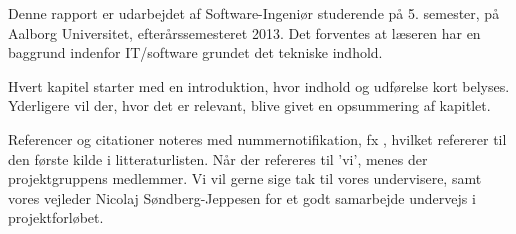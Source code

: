 Denne rapport er udarbejdet af Software-Ingeniør studerende på 5. semester, på Aalborg Universitet, efterårssemesteret 2013.
Det forventes at læseren har en baggrund indenfor IT/software grundet det tekniske indhold.

Hvert kapitel starter med en introduktion, hvor indhold og udførelse kort belyses.
Yderligere vil der, hvor det er relevant, blive givet en opsummering af kapitlet.

Referencer og citationer noteres med nummernotifikation, fx \cite{probabilisticRobotics}, hvilket refererer til den første kilde i litteraturlisten.
Når der refereres til 'vi', menes der projektgruppens medlemmer.
\newline
\newline
Vi vil gerne sige tak til vores undervisere, samt vores vejleder Nicolaj Søndberg-Jeppesen for et godt samarbejde undervejs i projektforløbet.